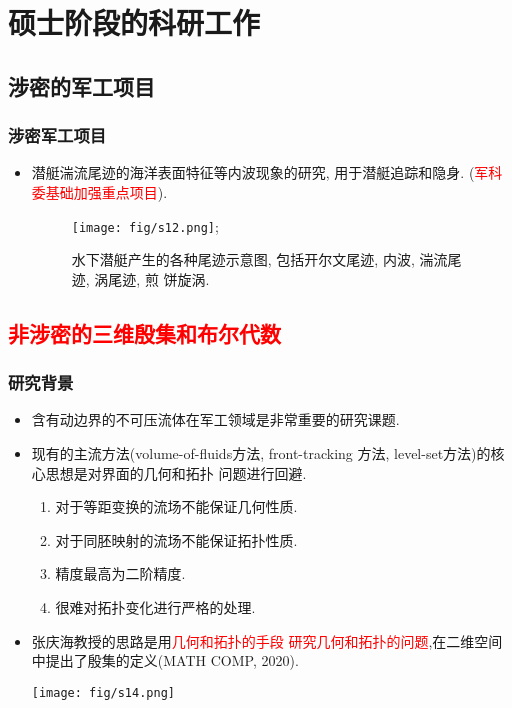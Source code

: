 \documentclass[UTF8]{ctexbeamer}	%
\theoremstyle{plain}
\theoremstyle{definition}
\theoremstyle{remark}
\numberwithin{equation}{section}
\begin{document}
\section{硕士阶段的科研工作}
\subsection{涉密的军工项目}
\begin{frame}
    \frametitle{涉密军工项目}
    \begin{itemize}
        \item 潜艇湍流尾迹的海洋表面特征等内波现象的研究, 用于潜艇追踪和隐身.
        (\textcolor{red}{军科委基础加强重点项目}).
        \begin{figure}
            \texttt{[image: fig/s12.png]};
            \caption{水下潜艇产生的各种尾迹示意图, 包括开尔文尾迹, 内波, 湍流尾迹, 涡尾迹, 煎
            饼旋涡.}
        \end{figure}
    \end{itemize}
\end{frame}

\subsection{\textcolor{red}{非涉密的三维殷集和布尔代数}}
\begin{frame}
    \frametitle{研究背景}
    \begin{itemize}
        \item 含有动边界的不可压流体在军工领域是非常重要的研究课题.
        \item 现有的主流方法(volume-of-fluids方法, front-tracking
        方法, level-set方法)的核心思想是对界面的几何和拓扑
        问题进行回避.
        \begin{enumerate}
            \item 对于等距变换的流场不能保证几何性质.
            \item 对于同胚映射的流场不能保证拓扑性质.
            \item 精度最高为二阶精度.
            \item 很难对拓扑变化进行严格的处理.
        \end{enumerate}
        \item 张庆海教授的思路是用\textcolor{red}{几何和拓扑的手段
        研究几何和拓扑的问题},在二维空间中提出了殷集的定义(MATH COMP, 2020).
        \begin{center}
            \texttt{[image: fig/s14.png]}
        \end{center}
    \end{itemize}
\end{frame}
\end{document}
